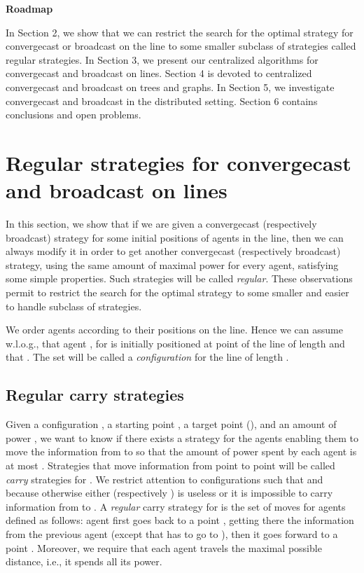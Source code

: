 \documentclass{article}
\newcommand\convergecast{convergecast\xspace}
\newcommand\broadcast{broadcast\xspace}
\newcommand\subproblem{carry\xspace}
\begin{document}
\noindent\textbf{Roadmap}

In Section 2, we show that we can restrict the search for the optimal strategy for convergecast or broadcast on the line to some smaller subclass of strategies called regular strategies. In Section 3, we present our centralized algorithms for convergecast and broadcast on lines. Section 4 is devoted to centralized convergecast and broadcast on trees and graphs. In Section 5, we investigate convergecast and broadcast in the distributed setting. Section 6 contains conclusions and open problems.

\section{Regular strategies for convergecast and broadcast on lines}

In this section, we show that if we are given a {\convergecast} (respectively \broadcast) strategy for some initial positions of agents in the line, then we can always modify it in order to get another {\convergecast} (respectively \broadcast) strategy, using the same amount of maximal power for every agent, satisfying some simple properties. Such strategies will be called \emph{regular}. These observations permit to restrict the search for the optimal strategy to some smaller and easier to handle subclass of
strategies.

We order agents according to their positions on the line. Hence we can assume w.l.o.g., that agent , for  is initially positioned at point  of the line of length  and that . 
The set  will be called a \emph{configuration} for the line of length .


\subsection{Regular {\subproblem} strategies}

Given a configuration , a starting point , a
target point  (), and an amount of power , we want to know if there
exists a strategy  for the agents enabling them to move the
information from  to  so that the amount of power spent by
each agent is at most . Strategies that move information from point  to point  will be called \emph{carry} strategies for . We restrict attention to configurations  such that  and  because otherwise either  (respectively ) is useless or it is impossible to carry information from  to . A \emph{regular} carry strategy for  is the set of moves for agents  defined as follows: agent  first goes back to a point , getting there the information
from the previous agent (except  that has to go to ), then it goes forward to a point . Moreover, we require
that each agent travels the maximal possible
distance, i.e., it spends all its power.
\end{document}
